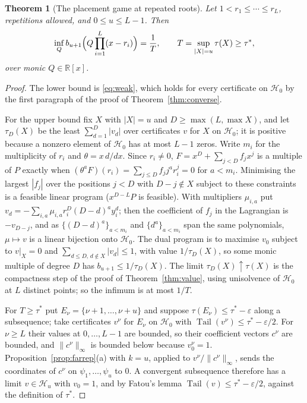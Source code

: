 \documentclass[11pt]{article}
\newtheorem{theorem}{Theorem}[section]
\theoremstyle{definition}
\theoremstyle{plain}
\newcommand{\R}{\mathbb R}
\DeclareMathOperator{\Tail}{Tail}
\begin{document}
\begin{theorem}[The placement game at repeated roots]\label{thm:valuerep}
Let $1<r_1\le\cdots\le r_L$, repetitions allowed, and $0\le u\le L-1$.  Then
\[
  \inf_Qb_{u+1}\Bigl(Q\prod_{i=1}^L(x-r_i)\Bigr)=\frac1T,
  \qquad T=\sup_{|X|=u}\tau(X)\ge\tau^*,
\]
over monic $Q\in\R[x]$.
\end{theorem}

\begin{proof}
The lower bound is \eqref{eq:weak}, which holds for every certificate on
$\mathcal H_0$ by the first paragraph of the proof of
Theorem~\ref{thm:converse}.

For the upper bound fix $X$ with $|X|=u$ and $D\ge\max(L,\max X)$, and let
$\tau_D(X)$ be the least $\sum_{d=1}^D|v_d|$ over certificates $v$ for $X$
on $\mathcal H_0$; it is positive because a nonzero element of
$\mathcal H_0$ has at most $L-1$ zeros.  Write $m_i$ for the multiplicity of
$r_i$ and $\theta=x\,d/dx$.  Since $r_i\ne0$, $F=x^D+\sum_{j<D}f_jx^j$ is a
multiple of $P$ exactly when
$(\theta^aF)(r_i)=\sum_{j\le D}f_jj^ar_i^j=0$ for $a<m_i$.  Minimising the
largest $|f_j|$ over the positions $j<D$ with $D-j\notin X$ subject to these
constraints is a feasible linear program ($x^{D-L}P$ is feasible).  With
multipliers $\mu_{i,a}$ put
$v_d=-\sum_{i,a}\mu_{i,a}r_i^D(D-d)^ay_i^d$; then the coefficient of $f_j$ in
the Lagrangian is $-v_{D-j}$, and as $\{(D-d)^a\}_{a<m_i}$ and
$\{d^a\}_{a<m_i}$ span the same polynomials, $\mu\mapsto v$ is a linear
bijection onto $\mathcal H_0$.  The dual program is to maximise $v_0$
subject to $v|_X=0$ and $\sum_{d\le D,\,d\notin X}|v_d|\le1$, with value
$1/\tau_D(X)$, so some monic multiple of degree $D$ has
$b_{u+1}\le1/\tau_D(X)$.  The limit $\tau_D(X)\uparrow\tau(X)$ is the
compactness step of the proof of Theorem~\ref{thm:value}, using unisolvence
of $\mathcal H_0$ at $L$ distinct points; so the infimum is at most $1/T$.

For $T\ge\tau^*$ put $E_\nu=\{\nu+1,\ldots,\nu+u\}$ and suppose
$\tau(E_\nu)\le\tau^*-\varepsilon$ along a subsequence; take certificates
$v^\nu$ for $E_\nu$ on $\mathcal H_0$ with
$\Tail(v^\nu)\le\tau^*-\varepsilon/2$.  For $\nu\ge L$ their values at
$0,\ldots,L-1$ are bounded, so their coefficient vectors $c^\nu$ are bounded,
and $\|c^\nu\|_\infty$ is bounded below because $v^\nu_0=1$.
Proposition~\ref{prop:farrep}(a) with $k=u$, applied to
$v^\nu/\|c^\nu\|_\infty$, sends the coordinates of $c^\nu$ on
$\psi_1,\ldots,\psi_u$ to $0$.  A convergent subsequence therefore has a
limit $v\in\mathcal H_u$ with $v_0=1$, and by Fatou's lemma
$\Tail(v)\le\tau^*-\varepsilon/2$, against the definition of $\tau^*$.
\end{proof}
\end{document}
